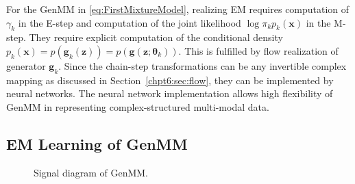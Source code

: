 For the GenMM in \eqref{eq:FirstMixtureModel}, realizing EM requires computation of $\gamma_k$ in the E-step and computation of the joint likelihood $\log{\pi_k p_k(\bm{x})}$ in the M-step. They require explicit computation of the conditional density $p_k(\bm{x}) =  p(\bm{g}_k(\bm{z})) =p(\bm{g}(\bm{z};\bm{\theta}_k))$. This is fulfilled by flow realization of generator $\bm{g}_k$. Since the chain-step transformations can be any invertible complex mapping as discussed in Section~\ref{chpt6:sec:flow}, they can be implemented by neural networks. The neural network implementation allows high flexibility of GenMM in representing complex-structured multi-modal data.


\subsection{EM Learning of GenMM}
\label{sec-algo-genmm}

\begin{figure}[tp!]
  \centering
  \caption{Signal diagram of GenMM.}\label{dia-emgm-nm}
\end{figure}

